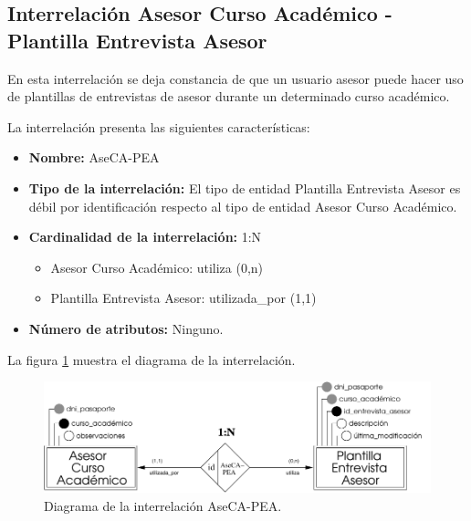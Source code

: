 \subsection{Interrelación Asesor Curso Académico - Plantilla Entrevista Asesor}

   \begin{description}
      \item[Definición] En esta interrelación se deja constancia de que un
      usuario asesor puede hacer uso de plantillas de entrevistas de asesor
      durante un determinado curso académico.

      \item[Características] La interrelación presenta las siguientes
                             características:

         \begin{itemize}
            \item \textbf{Nombre:} AseCA-PEA
            \item \textbf{Tipo de la interrelación:} El tipo de entidad
            Plantilla Entrevista Asesor es débil por identificación respecto al
            tipo de entidad Asesor Curso Académico.
            \item \textbf{Cardinalidad de la interrelación:} 1:N
                  \begin{itemize}
                     \item Asesor Curso Académico: utiliza (0,n)
                     \item Plantilla Entrevista Asesor: utilizada\_por (1,1)
                  \end{itemize}
            \item \textbf{Número de atributos:} Ninguno.
         \end{itemize}

      \item[Diagrama] La figura \ref{diagramaAseCA-PEA} muestra el diagrama de
      la interrelación.

      \item \begin{figure}[!ht]
            \begin{center}
            \includegraphics[]{07.Modelo_Entidad-Interrelacion/7.3.Analisis_Interrelaciones/diagramas/AseCA-PEA.pdf}
            \caption{Diagrama de la interrelación AseCA-PEA.}
            \label{diagramaAseCA-PEA}
            \end{center}
         \end{figure}


\end{description}
